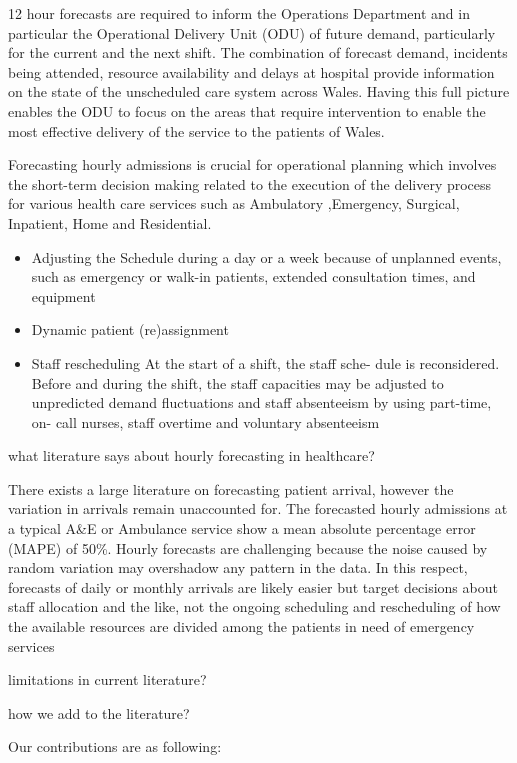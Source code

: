 \documentclass[]{elsarticle} %
\providecommand{\tightlist}{%
  \setlength{\itemsep}{0pt}\setlength{\parskip}{0pt}}
\begin{document}
12 hour forecasts are required to inform the Operations Department and in particular the Operational Delivery Unit (ODU) of future demand, particularly for the current and the next shift. The combination of forecast demand, incidents being attended, resource availability and delays at hospital provide information on the state of the unscheduled care system across Wales. Having this full picture enables the ODU to focus on the areas that require intervention to enable the most effective delivery of the service to the patients of Wales.

Forecasting hourly admissions is crucial for operational planning which involves the short-term decision making related to the execution of the delivery process for various health care services such as Ambulatory ,Emergency, Surgical, Inpatient, Home and Residential.

\begin{itemize}
\tightlist
\item
  Adjusting the Schedule during a day or a week because of unplanned events, such as emergency or walk-in patients, extended consultation times, and equipment
\item
  Dynamic patient (re)assignment
\item
  Staff rescheduling At the start of a shift, the staff sche- dule is reconsidered. Before and during the shift, the staff capacities may be adjusted to unpredicted demand fluctuations and staff absenteeism by using part-time, on- call nurses, staff overtime and voluntary absenteeism
\end{itemize}

what literature says about hourly forecasting in healthcare?

There exists a large literature on forecasting patient arrival, however the variation in arrivals remain unaccounted for. The forecasted hourly admissions at a typical A\&E or Ambulance service show a mean absolute percentage error (MAPE) of 50\%. Hourly forecasts are challenging because the noise caused by random variation may overshadow any pattern in the data. In this respect, forecasts of daily or monthly arrivals are likely easier but target decisions about staff allocation and the like, not the ongoing scheduling and rescheduling of how the available resources are divided among the patients in need of emergency services

limitations in current literature?

how we add to the literature?

Our contributions are as following:
\end{document}
